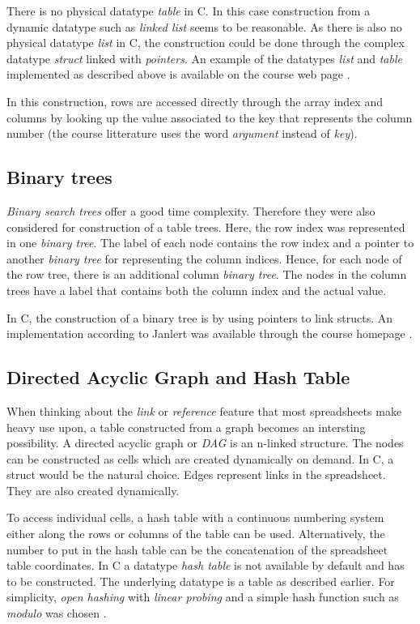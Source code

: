 \documentclass[a4paper,11pt,twoside]{article}
\begin{document}
There is no physical datatype \textit{table} in C. In this case construction
from a dynamic datatype such as \textit{linked list} seems to be reasonable. As
there is also no physical datatype \textit{list} in C, the construction could
be done through the complex datatype \textit{struct} linked with
\textit{pointers}. An example of the datatypes \textit{list} and
\textit{table} implemented as described above is available on the course
web page \cite{datatypes}.

In this construction, rows are accessed directly through the array
index and columns by looking up the value associated to the key that
represents the column number (the course litterature uses
the word \textit{argument} instead of \textit{key}\cite{janlert2000}). 
 

\subsection{Binary trees}
\textit{Binary search trees} offer a good time complexity. Therefore
they were also considered for construction of a table trees. 
Here, the row index was represented in one \textit{binary tree}. The
label of each node contains the row index and a pointer to
another \textit{binary tree} for representing the column indices. 
Hence, for each node of the row tree, there is an additional column
\textit{binary tree}. The nodes in the column trees have a label that
contains both the column index and the actual value. 

In C, the construction of a binary tree is by using pointers to link
structs. An implementation according to Janlert was available through
the course homepage \cite{datatypes}.



\subsection{Directed Acyclic Graph and Hash Table}
When thinking about the \emph{link} or \emph{reference} feature that most
spreadsheets make heavy use upon, a table constructed from a graph
becomes an intersting possibility.  A directed acyclic graph or
\textit{DAG} is an n-linked structure. The nodes can be
constructed as cells which are created dynamically on demand. In C, a
struct would be the natural choice. Edges represent links in the
spreadsheet. They are also created dynamically. 

To access individual cells, a hash table with a continuous numbering
system either along the rows or columns of the table can be
used. Alternatively, the number to put in the hash table can be the
concatenation of the spreadsheet table coordinates. In C a
datatype \textit{hash table} is not available by default and has to be
constructed. The underlying datatype is a table as described
earlier. For simplicity, \emph{open hashing} with \emph{linear
  probing} and a simple hash function such as \textit{modulo} was
chosen \cite[p. 277]{janlert2000}. 
\end{document}
